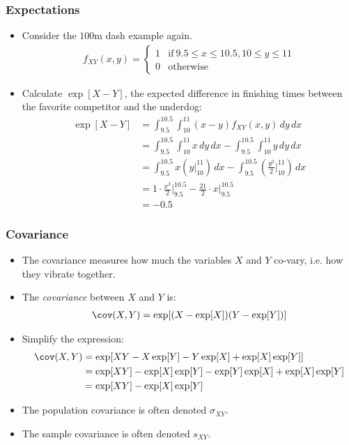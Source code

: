 \begin{frame}
\frametitle{Expectations} 
\begin{itemize}
\item Consider the $100$m dash example again.
\begin{align*}
f_{XY}(x,y) = 
  \begin{cases}
  1 & \text{if}~ 9.5 \leq x\leq 10.5, 10 \leq y \leq 11 \\
  0 &\text{otherwise}
  \end{cases}
\end{align*}
\item Calculate $\exp[X-Y]$, the expected difference in finishing times between the favorite competitor and the underdog:
\begin{align*}
\exp[X-Y] 
    & = \int_{9.5}^{10.5} \int_{10}^{11} (x-y)f_{XY}(x,y)\,dy\,dx\\
    & = \int_{9.5}^{10.5}\int_{10}^{11} x \,dy\,dx 
        - \int_{9.5}^{10.5}\int_{10}^{11} y\,dy\,dx\\
    & = \int_{9.5}^{10.5} x \left(y\bigg|_{10}^{11}\right)\,dx 
        - \int_{9.5}^{10.5} \left(\frac{y^{2}}{2}\bigg|_{10}^{11}\right)\,dx\\
    & = 1 \cdot \frac{x^{2}}{2}\bigg|_{9.5}^{10.5}
        - \frac{21}{2} \cdot x\bigg|_{9.5}^{10.5}\\
    & = -0.5
\end{align*}
\end{itemize}
\end{frame}


\begin{frame}
\frametitle{Covariance} 
\begin{itemize}
\item The covariance measures how much the variables $X$ and $Y$ co-vary, i.e. how they vibrate together.
\item The \emph{covariance} between $X$ and $Y$ is:
\begin{align*}
\cov(X,Y)= \exp[(X-\exp[X])(Y-\exp[Y])]
\end{align*} 
\item Simplify the expression:
\begin{align*}
\cov(X,Y) 
    & = \exp[XY-X\exp[Y] - Y\exp[X] +\exp[X]\exp[Y]]\\
    & = \exp[XY] - \exp[X]\exp[Y] - \exp[Y]\exp[X] + \exp[X]\exp[Y]\\
    & = \exp[XY]-\exp[X]\exp[Y]
\end{align*}
\item The population covariance is often denoted $\sigma_{XY}$.
\item The sample covariance is often denoted $s_{XY}$.
\end{itemize}
\end{frame}


